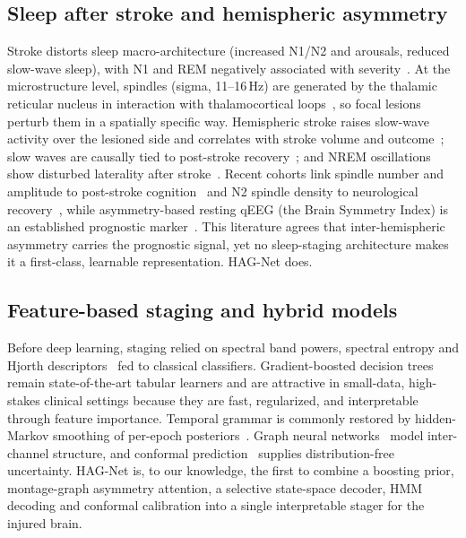 \documentclass[journal]{IEEEtran}
\begin{document}
\subsection{Sleep after stroke and hemispheric asymmetry}
Stroke distorts sleep macro-architecture (increased N1/N2 and arousals, reduced
slow-wave sleep), with N1 and REM negatively associated with
severity~\cite{bassetti2006sleep}. At the microstructure level, spindles (sigma,
11--16\,Hz) are generated by the thalamic reticular nucleus in interaction with
thalamocortical loops~\cite{fernandez2019spindles}, so focal lesions perturb them
in a spatially specific way. Hemispheric stroke raises slow-wave activity over the
lesioned side and correlates with stroke volume and
outcome~\cite{gottselig2002stroke}; slow waves are causally tied to post-stroke
recovery~\cite{facchin2020slowwaves}; and NREM oscillations show disturbed
laterality after stroke~\cite{simpson2023laterality}. Recent cohorts link spindle
number and amplitude to post-stroke cognition~\cite{zheng2025spindles} and N2
spindle density to neurological recovery~\cite{jing2025cpap}, while
asymmetry-based resting qEEG (the Brain Symmetry Index) is an established
prognostic marker~\cite{anastasi2017bsi}. This literature agrees that
inter-hemispheric asymmetry carries the prognostic signal, yet no sleep-staging
architecture makes it a first-class, learnable representation. HAG-Net does.

\subsection{Feature-based staging and hybrid models}
Before deep learning, staging relied on spectral band powers, spectral entropy and
Hjorth descriptors~\cite{hjorth1970eeg} fed to classical classifiers.
Gradient-boosted decision trees~\cite{chen2016xgboost,ke2017lightgbm,
prokhorenkova2018catboost} remain state-of-the-art tabular learners and are
attractive in small-data, high-stakes clinical settings because they are fast,
regularized, and interpretable through feature importance. Temporal grammar is
commonly restored by hidden-Markov smoothing of per-epoch
posteriors~\cite{chen2024hmm}. Graph neural networks~\cite{velickovic2018gat} model
inter-channel structure, and conformal prediction~\cite{angelopoulos2023conformal}
supplies distribution-free uncertainty. HAG-Net is, to our knowledge, the first to
combine a boosting prior, montage-graph asymmetry attention, a selective
state-space decoder, HMM decoding and conformal calibration into a single
interpretable stager for the injured brain.
\end{document}
